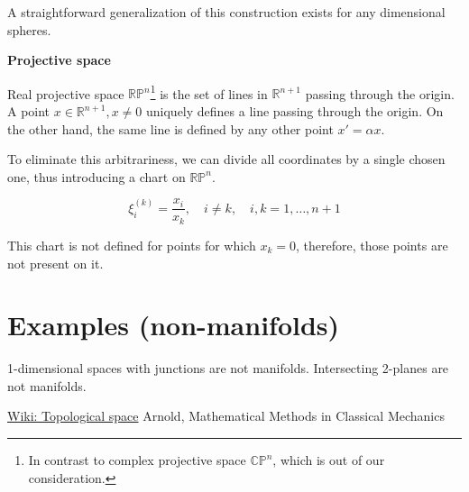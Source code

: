 \documentclass[a4paper,10pt]{article}
\begin{document}
A straightforward generalization of this construction exists for any dimensional spheres. 
\newline

{\bf Projective space}
\newline

Real projective space $\mathbb{RP}^n$\footnote{ In contrast to complex projective space $\mathbb{CP}^n$, which is out of our consideration.  } is the set of lines in $\mathbb{R}^{n+1}$ passing through the origin. A point $x \in \mathbb{R}^{n+1}, x\neq 0$ uniquely defines a line passing through the origin. On the other hand, the same line is defined by any other point $x' = \alpha x$. 

To eliminate this arbitrariness, we can divide all coordinates by a single chosen one, thus introducing a chart on $\mathbb{RP}^n$.

\begin{equation}
\xi^{(k)}_i = \frac{x_i}{x_k},  \quad i\neq k, \quad i,k = 1, \ldots, n+1 
\end{equation}

This chart is not defined for points for which $x_k = 0$, therefore, those points are not present on it. 

\section{Examples (non-manifolds)}

1-dimensional spaces with junctions are not manifolds. Intersecting 2-planes  are not manifolds.

\begin{thebibliography}{1}
 \href{https://en.wikipedia.org/wiki/Topological_space}{Wiki: Topological space}
 Arnold, Mathematical Methods in Classical Mechanics
\end{thebibliography}
\end{document}
